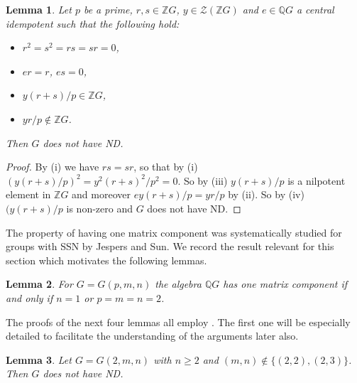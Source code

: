 \documentclass[a4paper,10pt]{amsart}
\newtheorem{lemma}{Lemma}[section]
\theoremstyle{definition}
\theoremstyle{remark}
\newcommand{\ZZ}{\mathcal{Z}}
\begin{document}
\begin{lemma}\label{lem:ThersyConstruction}
Let $p$ be a prime, $r,s \in \mathbb{Z}G$, $y \in \ZZ(\mathbb{Z}G)$ and $e \in \mathbb{Q}G$ a central idempotent such that the following hold:
\begin{itemize}
\item[(i)] $r^2 = s^2 = rs = sr = 0$,
\item[(ii)] $er = r$, $es = 0$,
\item[(iii)] $y(r+s)/p \in \mathbb{Z}G$,
\item[(iv)] $yr/p \notin \mathbb{Z}G$.
\end{itemize}
Then $G$ does not have ND.
\end{lemma} 
\begin{proof}
By (i) we have $rs = sr$, so that by (i) $(y(r+s)/p)^2 = y^2(r+s)^2/p^2 = 0$. So by (iii) $y(r+s)/p$ is a nilpotent element in $\mathbb{Z}G$ and moreover $ey(r+s)/p = yr/p$ by (ii). So by (iv) $(y(r+s)/p$ is non-zero and $G$ does not have ND.
\end{proof}

The property of having one matrix component was systematically studied for groups with SSN by Jespers and Sun. We record the result relevant for this section which motivates the following lemmas.

\begin{lemma}\label{lem:GpmnOneMatrixComponent} \cite[Lemmas 4.2, 4.3]{JespersSun}
For $G = G(p,m,n)$ the algebra $\mathbb{Q}G$ has one matrix component if and only if $n = 1$ or $p=m=n=2$. 
\end{lemma}

The proofs of the next four lemmas all employ . The first one will be especially detailed to facilitate the understanding of the arguments later also.

\begin{lemma}\label{lem:GpmnEvenCase}
Let $G = G(2,m,n)$ with $n \geq 2$ and $(m,n) \notin \{(2,2), (2,3) \}$. Then $G$ does not have ND.
\end{lemma}
\end{document}
